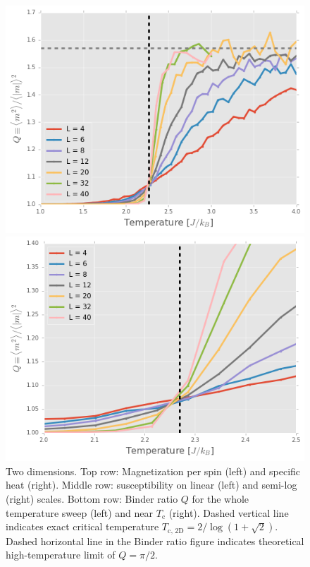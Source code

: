 \documentclass[11pt, oneside]{article}
\begin{document}
\begin{figure}
    \begin{minipage}{0.47\textwidth}
    \includegraphics[width=\linewidth]{img/2D/binderQ}
    \end{minipage}
    \hspace{\fill} %
    \begin{minipage}{0.47\textwidth}
    \includegraphics[width=\linewidth]{img/2D/binderQ_close}
    \end{minipage}
\caption{Two dimensions. Top row: Magnetization per spin (left) and specific heat (right). Middle row: susceptibility on linear (left) and semi-log (right) scales. Bottom row: Binder ratio $Q$ for the whole temperature sweep (left) and near $T_\text{c}$ (right). Dashed vertical line indicates exact critical temperature $T_{\text{c, 2D}}=2/\log(1+\sqrt2)$. Dashed horizontal line in the Binder ratio figure indicates theoretical high-temperature limit of $Q=\pi/2$.}
\label{fig:2D_all}
\end{figure}
\end{document}
